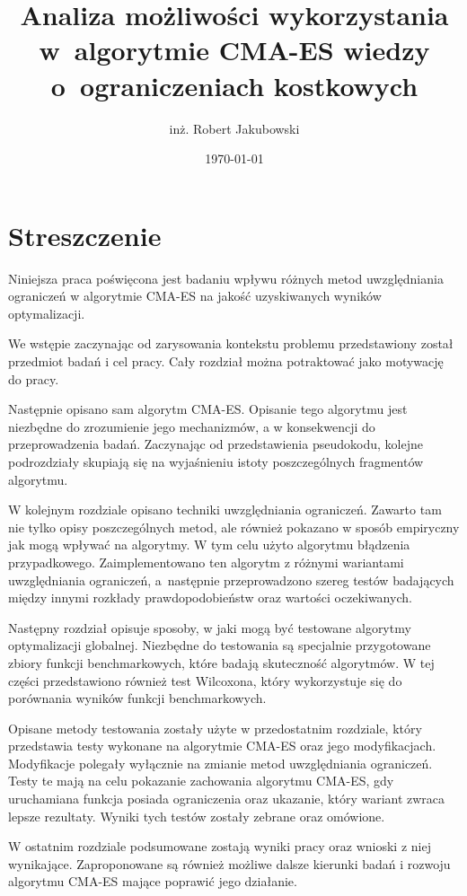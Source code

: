 \documentclass{mini}
\title{Analiza możliwości wykorzystania w~algorytmie CMA-ES wiedzy o~ograniczeniach kostkowych}
\author{inż. Robert Jakubowski}
\date{\today}
\begin{document}
\raggedbottom
{}

\section*{Streszczenie}
\hspace{3,4ex}Niniejsza praca poświęcona jest badaniu wpływu różnych metod uwzględniania ograniczeń w algorytmie CMA-ES na jakość uzyskiwanych wyników optymalizacji.

We wstępie zaczynając od zarysowania kontekstu problemu przedstawiony został przedmiot badań i cel pracy. Cały rozdział można potraktować jako motywację do pracy.

Następnie opisano sam algorytm CMA-ES. Opisanie tego algorytmu jest niezbędne do zrozumienie jego mechanizmów, a w konsekwencji do przeprowadzenia badań. Zaczynając od przedstawienia pseudokodu, kolejne podrozdziały skupiają się na wyjaśnieniu istoty poszczególnych fragmentów algorytmu. 

W kolejnym rozdziale opisano techniki uwzględniania ograniczeń. Zawarto tam nie tylko opisy poszczególnych metod, ale również pokazano w sposób empiryczny jak mogą wpływać na algorytmy. W tym celu użyto algorytmu błądzenia przypadkowego. Zaimplementowano ten algorytm z różnymi wariantami uwzględniania ograniczeń, a~następnie przeprowadzono szereg testów badających między innymi rozkłady prawdopodobieństw oraz wartości oczekiwanych.

Następny rozdział opisuje sposoby, w jaki mogą być testowane algorytmy optymalizacji globalnej. Niezbędne do testowania są specjalnie przygotowane zbiory funkcji benchmarkowych, które badają skuteczność algorytmów. W tej części przedstawiono również test Wilcoxona, który wykorzystuje się do porównania wyników funkcji benchmarkowych.

Opisane metody testowania zostały użyte w przedostatnim rozdziale, który przedstawia testy wykonane na algorytmie CMA-ES oraz jego modyfikacjach. Modyfikacje polegały wyłącznie na zmianie metod uwzględniania ograniczeń. Testy te mają na celu pokazanie zachowania algorytmu CMA-ES, gdy uruchamiana funkcja posiada ograniczenia oraz ukazanie, który wariant zwraca lepsze rezultaty. Wyniki tych testów zostały zebrane oraz omówione.

W ostatnim rozdziale podsumowane zostają wyniki pracy oraz wnioski z niej wynikające. Zaproponowane są również możliwe dalsze kierunki badań i rozwoju algorytmu CMA-ES mające poprawić jego działanie.

\pagebreak
\end{document}
